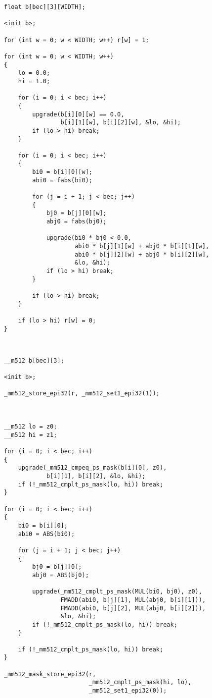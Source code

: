 \documentclass[
11pt,%
tightenlines,%
twoside,%
onecolumn,%
nofloats,%
nobibnotes,%
nofootinbib,%
superscriptaddress,%
noshowpacs,%
centertags]%
{revtex4}
\begin{document}
\begin{lstlisting}[caption={Схема программного кода перед переводом в векторную форму.},label={lst:prac_inter_pred}]
float b[bec][3][WIDTH];

<init b>;

for (int w = 0; w < WIDTH; w++) r[w] = 1;

for (int w = 0; w < WIDTH; w++)
{
    lo = 0.0;
    hi = 1.0;

    for (i = 0; i < bec; i++)
    {
        upgrade(b[i][0][w] == 0.0,
                b[i][1][w], b[i][2][w], &lo, &hi);
        if (lo > hi) break;
    }

    for (i = 0; i < bec; i++)
    {
        bi0 = b[i][0][w];
        abi0 = fabs(bi0);

        for (j = i + 1; j < bec; j++)
        {
            bj0 = b[j][0][w];
            abj0 = fabs(bj0);

            upgrade(bi0 * bj0 < 0.0,
                    abi0 * b[j][1][w] + abj0 * b[i][1][w],
                    abi0 * b[j][2][w] + abj0 * b[i][2][w],
                    &lo, &hi);
            if (lo > hi) break;
        }

        if (lo > hi) break;
    }

    if (lo > hi) r[w] = 0;
}
\end{lstlisting}

\ \\

\begin{lstlisting}[caption={Векторная форма получившегося программного кода из листинга \ref{lst:prac_inter_pred}.},label={lst:prac_inter_vec}]
__m512 b[bec][3];

<init b>;

_mm512_store_epi32(r, _mm512_set1_epi32(1));



__m512 lo = z0;
__m512 hi = z1;

for (i = 0; i < bec; i++)
{
    upgrade(_mm512_cmpeq_ps_mask(b[i][0], z0),
            b[i][1], b[i][2], &lo, &hi);
    if (!_mm512_cmplt_ps_mask(lo, hi)) break;
}

for (i = 0; i < bec; i++)
{
    bi0 = b[i][0];
    abi0 = ABS(bi0);

    for (j = i + 1; j < bec; j++)
    {
        bj0 = b[j][0];
        abj0 = ABS(bj0);

        upgrade(_mm512_cmplt_ps_mask(MUL(bi0, bj0), z0),
                FMADD(abi0, b[j][1], MUL(abj0, b[i][1])),
                FMADD(abi0, b[j][2], MUL(abj0, b[i][2])),
                &lo, &hi);
        if (!_mm512_cmplt_ps_mask(lo, hi)) break;
    }

    if (!_mm512_cmplt_ps_mask(lo, hi)) break;
}

_mm512_mask_store_epi32(r,
                        _mm512_cmplt_ps_mask(hi, lo),
                        _mm512_set1_epi32(0));
\end{lstlisting}
\end{document}
